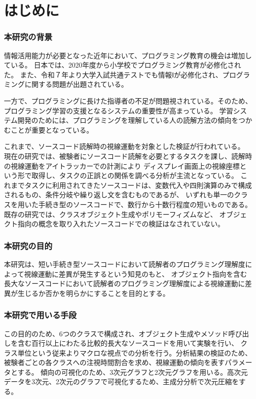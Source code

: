 \documentclass[paper=a4paper,fontsize=11pt]{jlreq}
\begin{document}
\tableofcontents
\clearpage

\part{はじめに}
  \section{本研究の背景}
    情報活用能力が必要となった近年において、プログラミング教育の機会は増加している。
    日本では、2020年度から小学校でプログラミング教育が必修化された\cite{syougaku_program}。
    また、令和７年より大学入試共通テストでも情報Ⅰが必修化され、プログラミングに関する問題が出題されている\cite{tusuto_mondai}。

    一方で、プログラミングに長けた指導者の不足が問題視されている。そのため、プログラミング学習の支援となるシステムの重要性が高まっている。
    学習システム開発のためには、プログラミングを理解している人の読解方法の傾向をつかむことが重要となっている。
    
    これまで、ソースコード読解時の視線運動を対象とした検証が行われている\cite{meiji2021}\cite{hanafusa}\cite{uwano}。
    現在の研究では、被験者にソースコード読解を必要とするタスクを課し、読解時の視線運動をアイトラッカーでの計測により
    ディスプレイ画面上の視線座標という形で取得し、タスクの正誤との関係を調べる分析が主流となっている。
    これまでタスクに利用されてきたソースコードは、変数代入や四則演算のみで構成されるもの、条件分岐や繰り返し文を含むものであるが、
    いずれも単一のクラスを用いた手続き型のソースコードで、数行から十数行程度の短いものである。既存の研究では、クラスオブジェクト生成やポリモーフィズムなど、
    オブジェクト指向の概念を取り入れたソースコードでの検証はなされていない。
  \clearpage
  
  \section{本研究の目的}
    本研究は、短い手続き型ソースコードにおいて読解者のプログラミング理解度によって視線運動に差異が発生するという知見のもと、
    オブジェクト指向を含む長大なソースコードにおいて読解者のプログラミング理解度による視線運動に差異が生じるか否かを明らかにすることを目的とする。
    
  \section{本研究で用いる手段}
    この目的のため、6つのクラスで構成され、オブジェクト生成やメソッド呼び出しを含む百行以上にわたる比較的長大なソースコードを用いて実験を行い、
    クラス単位という従来よりマクロな視点での分析を行う。分析結果の検証のため、被験者ごとの各クラスへの注視時間割合を求め、視線運動の傾向を表すパラメータとする。
    傾向の可視化のため、3次元グラフと2次元グラフを用いる。高次元データを3次元、2次元のグラフで可視化するため、主成分分析で次元圧縮をする。
    \clearpage
\end{document}
